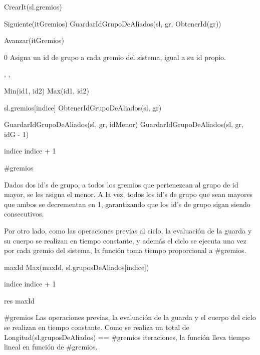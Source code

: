 {
	\state {} \asig CrearIt(sl.gremios)		
		\state
		
		\state {} \asig Siguiente(itGremios)							
		\state GuardarIdGrupoDeAliados(sl, gr, ObtenerId(gr))				

		\state
		\state Avanzar(itGremios)											
	\endwhile
}
{0}
{ Asigna un id de grupo a cada gremio del sistema, igual a su id propio. }

{, , }{}
{
	\state {} \asig Min(id1, id2)						
	\state {} \asig Max(id1, id2)						
	\state

	\state {} 										

									
		\state

		\state {} \asig sl.gremios[indice]					
		\state {} \asig ObtenerIdGrupoDeAliados(sl, gr)		
		\state

														
			\state GuardarIdGrupoDeAliados(sl, gr, idMenor)					
		\Else {}										
				\state GuardarIdGrupoDeAliados(sl, gr, idG - 1)				
			\endif
		\endif
		\state

		\state indice \asig indice + 1										
	\endwhile
}
{\#gremios}
{ Dados dos id's de grupo, a todos los gremios que pertenezcan al grupo de id mayor, se les asigna el menor. A la vez, todos los id's de grupo que sean mayores que ambos se decrementan en 1, garantizando que los id's de grupo sigan siendo consecutivos.

Por otro lado, como las operaciones previas al ciclo, la evaluación de la guarda y su cuerpo se realizan en tiempo constante, y además el ciclo se ejecuta una vez por cada gremio del sistema, la función toma tiempo proporcional a \#gremios. }

{
	\state {} 									

	\state
	\state {} 								
					
		\state
		
		\state maxId \asig Max(maxId, sl.gruposDeAliados[indice])	

		\state
		\state indice \asig indice + 1								
	\endwhile
	\state

	\state res \asig maxId											
}
{ \#gremios }
{ Las operaciones previas, la evaluación de la guarda y el cuerpo del ciclo se realizan en tiempo constante. Como se realiza un total de Longitud(sl.gruposDeAliados) == \#gremios iteraciones, la función lleva tiempo lineal en función de \#gremios. }

